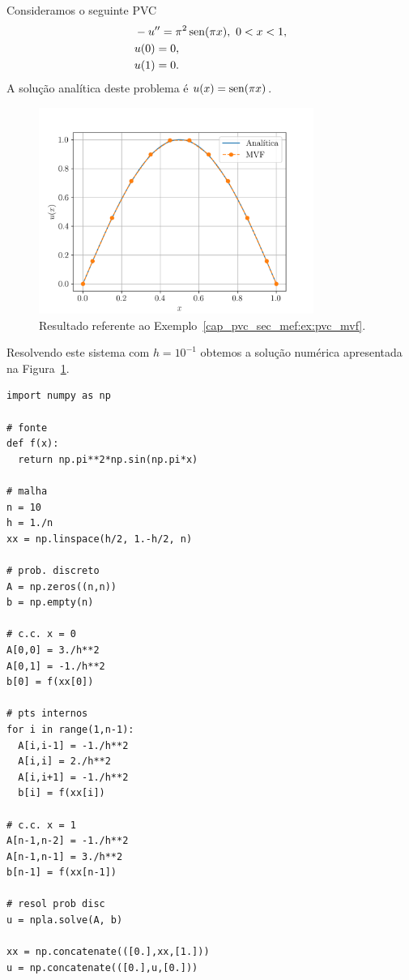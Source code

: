 \begin{ex}\label{cap_pvc_sec_mvf:ex:pvc_mvf}
  Consideramos o seguinte PVC
  \begin{align}
    &-u'' = \pi^2\operatorname{sen}(\pi x), ~0 < x < 1,\\
    &u(0) = 0,\\
    &u(1) = 0.
  \end{align}
  A solução analítica deste problema é $u(x) = \operatorname{sen}(\pi x)$.
  
  \begin{figure}[h!]
    \centering
    \includegraphics[width=0.8\textwidth]{./cap_pvc/dados/fig_mvf/fig}
    \caption{Resultado referente ao Exemplo~\ref{cap_pvc_sec_mef:ex:pvc_mvf}.}
    \label{cap_pvc_sec_mvf:fig:ex_pvc_mvf}
  \end{figure}

  Resolvendo este sistema com $h=10^{-1}$ obtemos a solução numérica apresentada na Figura~\ref{cap_pvc_sec_mvf:fig:ex_pvc_mvf}.

\begin{lstlisting}[caption=pvc\_mvf.py]
import numpy as np

# fonte
def f(x):
  return np.pi**2*np.sin(np.pi*x)

# malha
n = 10
h = 1./n
xx = np.linspace(h/2, 1.-h/2, n)

# prob. discreto
A = np.zeros((n,n))
b = np.empty(n)

# c.c. x = 0
A[0,0] = 3./h**2
A[0,1] = -1./h**2
b[0] = f(xx[0])

# pts internos
for i in range(1,n-1):
  A[i,i-1] = -1./h**2
  A[i,i] = 2./h**2
  A[i,i+1] = -1./h**2
  b[i] = f(xx[i])

# c.c. x = 1
A[n-1,n-2] = -1./h**2
A[n-1,n-1] = 3./h**2
b[n-1] = f(xx[n-1])

# resol prob disc
u = npla.solve(A, b)

xx = np.concatenate(([0.],xx,[1.]))
u = np.concatenate(([0.],u,[0.]))
\end{lstlisting}
\end{ex}

